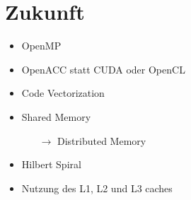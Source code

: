 \section*{Zukunft}
\begin{itemize}
  \item OpenMP
  \item OpenACC statt CUDA oder OpenCL
  \item Code Vectorization
  \item Shared Memory
  \begin{itemize}
    \item[\( \rightarrow \)] Distributed Memory
  \end{itemize}
  \item Hilbert Spiral
  \item Nutzung des L1, L2 und L3 caches
\end{itemize}
